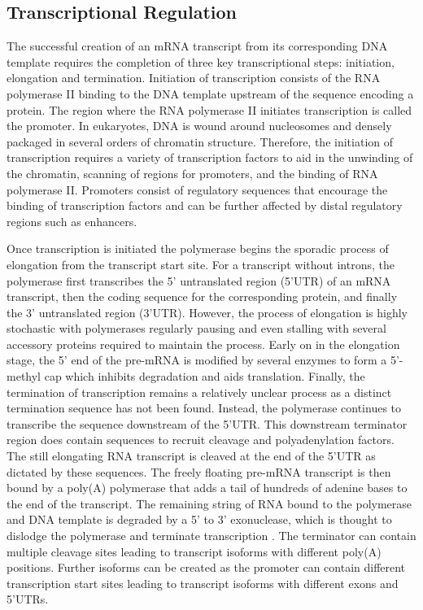 \documentclass[../main.tex]{subfiles}
\begin{document}
\subsection{Transcriptional Regulation}

The successful creation of an mRNA transcript from its corresponding DNA template requires the completion of three key transcriptional steps: initiation, elongation and termination.
Initiation of transcription consists of the RNA polymerase II binding to the DNA template upstream of the sequence encoding a protein.
The region where the RNA polymerase II initiates transcription is called the promoter.
In eukaryotes, DNA is wound around nucleosomes and densely packaged in several orders of chromatin structure.
Therefore, the initiation of transcription requires a variety of transcription factors to aid in the unwinding of the chromatin, scanning of regions for promoters, and the binding of RNA polymerase II.
Promoters consist of regulatory sequences that encourage the binding of transcription factors and can be further affected by distal regulatory regions such as enhancers. 

Once transcription is initiated the polymerase begins the sporadic process of elongation from the transcript start site.
For a transcript without introns, the polymerase first transcribes the 5' untranslated region (5'UTR) of an mRNA transcript, then the coding sequence for the corresponding protein, and finally the 3' untranslated region (3'UTR).
However, the process of elongation is highly stochastic with polymerases regularly pausing and even stalling with several accessory proteins required to maintain the process.
Early on in the elongation stage, the 5' end of the pre-mRNA is modified by several enzymes to form a 5'-methyl cap which inhibits degradation and aids translation.
Finally, the termination of transcription remains a relatively unclear process as a distinct termination sequence has not been found.
Instead, the polymerase continues to transcribe the sequence downstream of the 5'UTR.
This downstream terminator region does contain sequences to recruit cleavage and polyadenylation factors.
The still elongating RNA transcript is cleaved at the end of the 5'UTR as dictated by these sequences.
The freely floating pre-mRNA transcript is then bound by a poly(A) polymerase that adds a tail of hundreds of adenine bases to the end of the transcript.
The remaining string of RNA bound to the polymerase and DNA template is degraded by a 5' to 3' exonuclease, which is thought to dislodge the polymerase and terminate transcription \parencite{Alberts2017}.
The terminator can contain multiple cleavage sites leading to transcript isoforms with different poly(A) positions.
Further isoforms can be created as the promoter can contain different transcription start sites leading to transcript isoforms with different exons and 5'UTRs.
\end{document}
